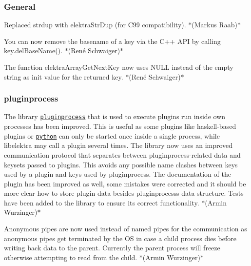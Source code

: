 \subsubsection*{General}


\begin{DoxyItemize}
\item Replaced {\ttfamily strdup} with {\ttfamily elektra\+Str\+Dup} (for C99 compatibility). $\ast$(Markus Raab)$\ast$
\item You can now remove the basename of a key via the C++ A\+PI by calling {\ttfamily key.\+del\+Base\+Name()}. $\ast$(René Schwaiger)$\ast$
\item The function {\ttfamily elektra\+Array\+Get\+Next\+Key} now uses {\ttfamily N\+U\+LL} instead of the empty string as init value for the returned key. $\ast$(René Schwaiger)$\ast$
\end{DoxyItemize}

\subsubsection*{pluginprocess}


\begin{DoxyItemize}
\item The library \href{http://master.libelektra.org/src/libs/pluginprocess}{\tt {\ttfamily pluginprocess}} that is used to execute plugins run inside own processes has been improved. This is useful as some plugins like haskell-\/based plugins or \href{http://libelektra.org/plugins/python}{\tt {\ttfamily python}} can only be started once inside a single process, while libelektra may call a plugin several times. The library now uses an improved communication protocol that separates between pluginprocess-\/related data and keysets passed to plugins. This avoids any possible name clashes between keys used by a plugin and keys used by pluginprocess. The documentation of the plugin has been improved as well, some mistakes were corrected and it should be more clear how to store plugin data besides pluginprocess\textquotesingle{}s data structure. Tests have been added to the library to ensure its correct functionality. $\ast$(Armin Wurzinger)$\ast$
\item Anonymous pipes are now used instead of named pipes for the communication as anonymous pipes get terminated by the OS in case a child process dies before writing back data to the parent. Currently the parent process will freeze otherwise attempting to read from the child. $\ast$(Armin Wurzinger)$\ast$
\end{DoxyItemize}

